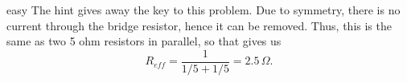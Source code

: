 \begin{solution}{easy}
The hint gives away the key to this problem. Due to symmetry, there is no current through the bridge resistor, hence it can be removed. Thus, this is the same as two 5 ohm resistors in parallel, so that gives us$$R_{eff} = \dfrac{1}{1/5+1/5} = \boxed{2.5 \, \Omega}.$$
\end{solution}